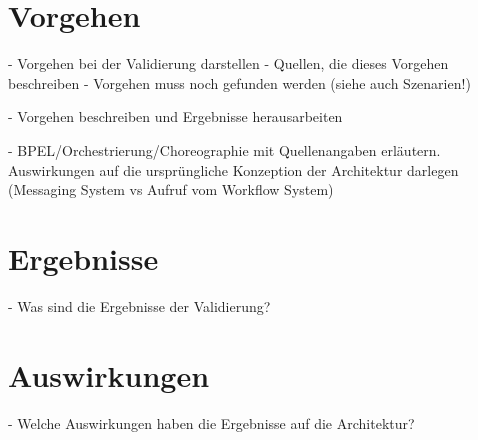 
\section{Vorgehen} %
\label{sec:vorgehen}

  - Vorgehen bei der Validierung darstellen
  - Quellen, die dieses Vorgehen beschreiben
  - Vorgehen muss noch gefunden werden (siehe auch Szenarien!)
  
  - Vorgehen beschreiben und Ergebnisse herausarbeiten

  - BPEL/Orchestrierung/Choreographie mit Quellenangaben erläutern. Auswirkungen auf die ursprüngliche Konzeption der Architektur darlegen (Messaging System vs Aufruf vom Workflow System)


\section{Ergebnisse} %
\label{sec:ergebnisse}

  - Was sind die Ergebnisse der Validierung?


\section{Auswirkungen} %
\label{sec:auswirkungen}

  - Welche Auswirkungen haben die Ergebnisse auf die Architektur?



